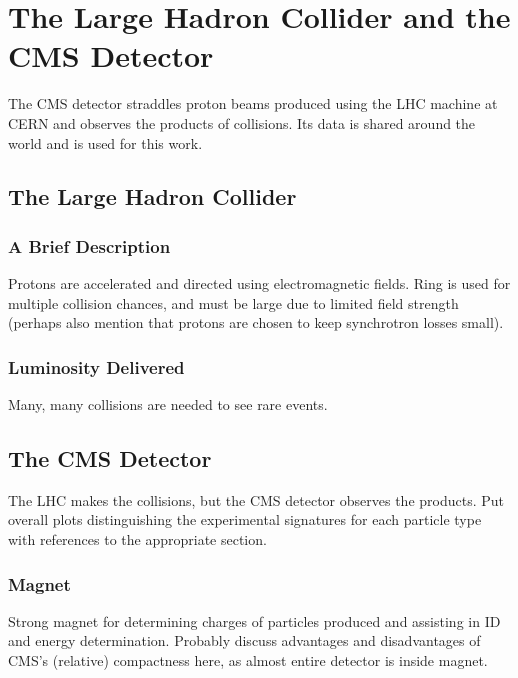 \chapter{The Large Hadron Collider and the CMS Detector}

The CMS detector straddles proton beams produced using the LHC machine at CERN and observes the products of collisions.
Its data is shared around the world and is used for this work.

\section{The Large Hadron Collider} \label{sec:LHC}

  \subsection{A Brief Description} \label{sec:LHCdescription}

  Protons are accelerated and directed using electromagnetic fields.
  Ring is used for multiple collision chances, and must be large due to limited field strength (perhaps also mention that protons are chosen to keep synchrotron losses small).

  \subsection{Luminosity Delivered} \label{sec:lumi}

  Many, many collisions are needed to see rare events.

\section{The CMS Detector} \label{sec:CMS}

  The LHC makes the collisions, but the CMS detector observes the products.
  Put overall plots distinguishing the experimental signatures for each particle type with references to the appropriate section.

  \subsection{Magnet} \label{sec:magnet}

  Strong magnet for determining charges of particles produced and assisting in ID and energy determination.
  Probably discuss advantages and disadvantages of CMS's (relative) compactness here, as almost entire detector is inside magnet.

